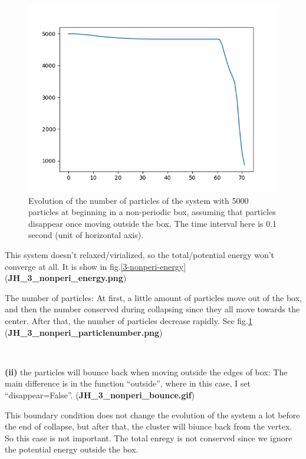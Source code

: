 \documentclass[showpacs, oneside, onecolumn, prl, amsmath, amssymb, nofootinbib, superscriptaddress, notitlepage]{revtex4-1}
\newcommand\bfig{\begin{figure}}
\newcommand\efig{\end{figure}}
\begin{document}
\bfig
	\centering
	\includegraphics[scale=0.8]{JH_3_nonperi_particlenumber.png}
	\caption{Evolution of the number of particles of the system with 5000 particles at beginning in a non-periodic box, assuming that particles disappear once moving outside the box. The time interval here is 0.1 second (unit of horizontal axis).}
	\label{3-nonperi-number}
\efig


This system doesn't relaxed/virialized, so the total/potential energy won't converge at all. It is show in fig.\ref{3-nonperi-energy} (\textbf{JH\_3\_nonperi\_energy.png})

The number of particles: At first, a little amount of particles move out of the box, and then the number conserved during collapsing since they all move towards the center. After that, the number of particles decrease rapidly. See fig.\ref{3-nonperi-number} (\textbf{JH\_3\_nonperi\_particlenumber.png})

~~~~

\textbf{(ii)} the particles will bounce back when moving outside the edges of box:\newline
The main difference is in the function ``outside'', where in this case, I set ``disappear=False''.\newline
(\textbf{JH\_3\_nonperi\_bounce.gif})

This boundary condition does not change the evolution of the system a lot before the end of collapse, but after that, the cluster will biunce back from the vertex. So this case is not important. The total enregy is not conserved since we ignore the potential energy outside the box.
\end{document}
